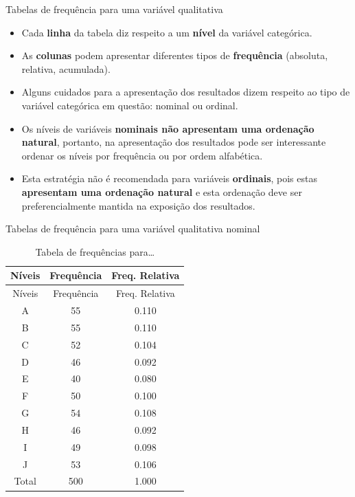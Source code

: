 \documentclass[
  ignorenonframetext,
  serif,
  professionalfont,
  usenames,
  dvipsnames,
  aspectratio = 169]{beamer}
\begin{document}
\begin{frame}{Tabelas de frequência para uma variável qualitativa}
\protect\hypertarget{tabelas-de-frequuxeancia-para-uma-variuxe1vel-qualitativa-1}{}
\begin{itemize}
\item
  Cada \textbf{linha} da tabela diz respeito a um \textbf{nível} da
  variável categórica.
\item
  As \textbf{colunas} podem apresentar diferentes tipos de
  \textbf{frequência} (absoluta, relativa, acumulada).
\item
  Alguns cuidados para a apresentação dos resultados dizem respeito ao
  tipo de variável categórica em questão: nominal ou ordinal.
\item
  Os níveis de variáveis
  \textbf{nominais não apresentam uma ordenação natural}, portanto, na
  apresentação dos resultados pode ser interessante ordenar os níveis
  por frequência ou por ordem alfabética.
\item
  Esta estratégia não é recomendada para variáveis \textbf{ordinais},
  pois estas \textbf{apresentam uma ordenação natural} e esta ordenação
  deve ser preferencialmente mantida na exposição dos resultados.
\end{itemize}
\end{frame}

\begin{frame}{Tabelas de frequência para uma variável qualitativa
nominal}
\protect\hypertarget{tabelas-de-frequuxeancia-para-uma-variuxe1vel-qualitativa-nominal}{}
\begin{longtable}[]{@{}ccc@{}}
\caption{Tabela de frequências para\ldots{}}\tabularnewline
\toprule()
Níveis & Frequência & Freq. Relativa \\
\midrule()
\endfirsthead
\toprule()
Níveis & Frequência & Freq. Relativa \\
\midrule()
\endhead
A & 55 & 0.110 \\
B & 55 & 0.110 \\
C & 52 & 0.104 \\
D & 46 & 0.092 \\
E & 40 & 0.080 \\
F & 50 & 0.100 \\
G & 54 & 0.108 \\
H & 46 & 0.092 \\
I & 49 & 0.098 \\
J & 53 & 0.106 \\
Total & 500 & 1.000 \\
\bottomrule()
\end{longtable}
\end{frame}
\end{document}
